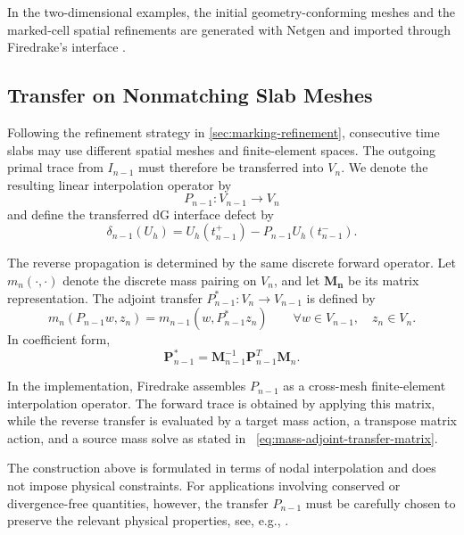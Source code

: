 In the two-dimensional examples, the initial geometry-conforming meshes and the marked-cell spatial refinements are generated with Netgen and imported through Firedrake's interface \cite{Schoeberl1997Netgen,Firedrake}.



\subsection{Transfer on Nonmatching Slab Meshes}
\label{sec:slab-transfer-adjoint}

Following the refinement strategy in \cref{sec:marking-refinement}, consecutive time slabs may use different spatial meshes and finite-element spaces. The outgoing primal trace from \(I_{n-1}\) must therefore be transferred into \(V_n\). We denote the resulting linear interpolation operator by
\begin{equation}
  P_{n-1}:V_{n-1}\longrightarrow V_n
  \label{eq:forward-slab-transfer}
\end{equation}
and define the transferred dG interface defect by
\begin{equation}
  \delta_{n-1}(U_h)
  =
  U_h(t_{n-1}^{+})
  -
  P_{n-1}U_h(t_{n-1}^{-}).
  \label{eq:transferred-interface-defect-full}
\end{equation}

The reverse propagation is determined by the same discrete forward operator. Let \(m_n(\cdot,\cdot)\) denote the discrete mass pairing on \(V_n\), and let \( \mathbf{M_n}\) be its matrix representation. The adjoint transfer \(P_{n-1}^{\ast}:V_n\to V_{n-1}\) is defined by
\begin{equation}
  m_n(P_{n-1}w,z_n)
  =
  m_{n-1}(w,P_{n-1}^{\ast}z_n)
  \qquad
  \forall w\in V_{n-1},\quad z_n\in V_n.
  \label{eq:mass-adjoint-transfer-definition}
\end{equation}
In coefficient form,
\begin{equation}
  \mathbf P_{n-1}^{\ast} = \mathbf M_{n-1}^{-1} \mathbf P_{n-1}^{T} \mathbf M_n.
  \label{eq:mass-adjoint-transfer-matrix}
\end{equation}

In the implementation, Firedrake assembles \(P_{n-1}\) as a cross-mesh finite-element interpolation operator. The forward trace is obtained by applying this matrix, while the reverse transfer is evaluated by a target mass action, a transpose matrix action, and a source mass solve as stated in ~\eqref{eq:mass-adjoint-transfer-matrix}.

The construction above is formulated in terms of nodal interpolation and does not impose physical constraints. For applications involving conserved or divergence-free quantities, however, the transfer \(P_{n-1}\) must be carefully chosen to preserve the relevant physical properties, see, e.g., \cite{non-flow}.

